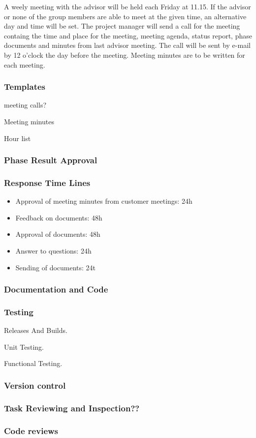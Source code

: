 A weely meeting with the advisor will be held each Friday at 11.15. If the advisor or none of the group members are able to meet at the given time, an alternative day and time will be set. The project manager will send a call for the meeting containg the time and place for the meeting, meeting agenda, status report, phase documents and minutes from last advisor meeting. The call will be sent by e-mail by 12 o'clock the day before the meeting. Meeting minutes are to be written for each meeting.

\subsubsection{Templates}

meeting calls?

Meeting minutes

Hour list


\subsubsection{Phase Result Approval}

\subsubsection{Response Time Lines}
\begin{itemize}
	\item Approval of meeting minutes from customer meetings: 24h
	\item Feedback on documents: 48h
	\item Approval of documents: 48h
	\item Answer to questions: 24h
	\item Sending of documents: 24t
\end{itemize}

\subsubsection{Documentation and Code}

\subsubsection{Testing}

Releases And Builds.

Unit Testing.

Functional Testing.

\subsubsection{Version control}

\subsubsection{Task Reviewing and Inspection??}

\subsubsection{Code reviews}
